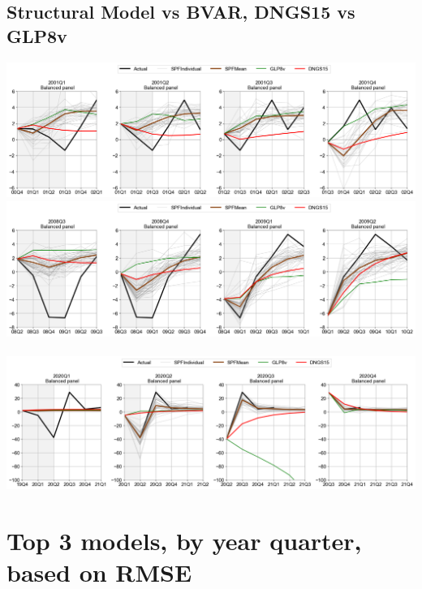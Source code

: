 \documentclass{article}
\begin{document}
\begin{landscape}
\pagebreak
\section{\Large Structural Model vs BVAR, DNGS15 vs GLP8v}

\includegraphics[scale=0.7]{Struct_vs_BVAR_20012002}\\

\pagebreak
\includegraphics[scale=0.7]{Struct_vs_BVAR_20082009}\\
\bigskip \\
\includegraphics[scale=0.7]{Struct_vs_BVAR_20202021}

\end{landscape}

\pagebreak
\section{\Large Top 3 models, by year quarter, based on RMSE}
\end{document}
